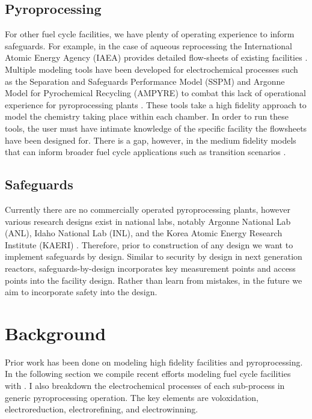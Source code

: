 \subsection{Pyroprocessing}
For other fuel cycle facilities, we have plenty of operating experience to inform safeguards. For example, in the case of aqueous reprocessing
the International Atomic Energy Agency (IAEA) provides detailed flow-sheets of existing facilities \cite{international_atomic_energy_agency_implications_2004}. Multiple modeling
tools have been developed for electrochemical processes such as the Separation and Safeguards Performance Model (SSPM) and Argonne Model for Pyrochemical Recycling (AMPYRE) to combat this lack of operational experience for pyroprocessing plants \cite{maggos_update_2015}. 
These tools take a high fidelity approach to model the
chemistry taking place within each chamber. In order to run these tools, the user must have intimate knowledge of the specific facility the flowsheets have
been designed for. There is a gap, however, in the medium fidelity models that can inform broader fuel cycle applications such as transition scenarios \cite{borrelli_approaches_2017}. 

\subsection{Safeguards}
Currently there are no commercially operated pyroprocessing plants, however various research designs exist in national labs,
notably Argonne National Lab (ANL), Idaho National Lab (INL), and the Korea Atomic Energy Research Institute (KAERI) \cite{michael_f._simpson_developments_2012, lee_advanced, frigo_conceptual_2003}. 
Therefore, prior to construction of any design we 
want to implement safeguards by design. Similar to security by design in next generation reactors, safeguards-by-design incorporates key measurement 
points and access points into the facility design. Rather than learn from mistakes, in the future we aim to incorporate safety 
into the design.

\section{Background}
Prior work has been done on modeling high fidelity facilities and pyroprocessing. In the following section we compile recent efforts modeling fuel cycle facilities with
\Cyclus. I also breakdown the electrochemical processes of each sub-process in generic pyroprocessing operation. The key elements are voloxidation, electroreduction, electrorefining, and electrowinning. 

